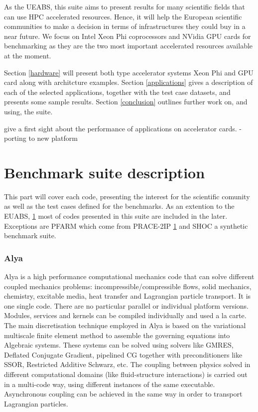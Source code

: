 As the UEABS, this suite aims to present results for many scientific fields that can use HPC accelerated resources. Hence, it will help the European scientific communities to make a decision in terms of infrastructures they could buy in a near future. We focus on Intel Xeon Phi coprocessors and NVidia GPU cards for benchmarking as they are the two most important accelerated resources available at the moment.

Section \ref{hardware} will present both type accelerator systems Xeon Phi and GPU card along with architcture examples. Section \ref{applications} gives a description of each of the selected applications, together with the test case datasets, and presents some sample results. Section \ref{conclusion} outlines further work on, and using, the suite.

 give a first sight about the performance of applications on accelerator cards.
  - porting to new platform



\part{Benchmark suite description}
This part will cover each code, presenting the interest for the scientific comunity as well as the test cases defined for the benchmarks.
As an extention to the EUABS, \ref{} most of codes presented in this suite are included in the later. Exceptions are PFARM which come from PRACE-2IP \ref{} and SHOC a synthetic benchmark suite.
\section{Alya}
Alya is a high performance computational mechanics code that can solve different coupled mechanics problems: incompressible/compressible flows, solid mechanics, chemistry, excitable media, heat transfer and Lagrangian particle transport. It is one single code. There are no particular parallel or individual platform versions. Modules, services and kernels can be compiled individually and used a la carte. The main discretisation technique employed in Alya is based on the variational multiscale finite element method to assemble the governing equations into Algebraic systems. These systems can be solved using solvers like GMRES, Deflated Conjugate Gradient, pipelined CG together with preconditioners like SSOR, Restricted Additive Schwarz, etc. The coupling between physics solved in different computational domains (like fluid-structure interactions) is carried out in a multi-code way, using different instances of the same executable. Asynchronous coupling can be achieved in the same way in order to transport Lagrangian particles.

